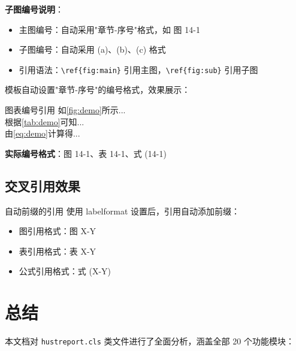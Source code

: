 \documentclass[linux]{hustreport}
\begin{document}
\textbf{子图编号说明}：
\begin{itemize}
    \item 主图编号：自动采用"章节-序号"格式，如 图 14-1
    \item 子图编号：自动采用 (a)、(b)、(c) 格式
    \item 引用语法：\verb|\ref{fig:main}| 引用主图，\verb|\ref{fig:sub}| 引用子图
\end{itemize}




模板自动设置"章节-序号"的编号格式，效果展示：

\begin{democode}{图表编号引用}
如\ref{fig:demo}所示... \\
根据\ref{tab:demo}可知... \\
由\ref{eq:demo}计算得...
\end{democode}

\textbf{实际编号格式}：图 14-1、表 14-1、式 (14-1)

\subsection{交叉引用效果}

\begin{demovert}{自动前缀的引用}
使用 labelformat 设置后，引用自动添加前缀：
\begin{itemize}
    \item 图引用格式：图 X-Y
    \item 表引用格式：表 X-Y
    \item 公式引用格式：式 (X-Y)
\end{itemize}
\end{demovert}

\newpage
\section*{总结}

本文档对 \texttt{hustreport.cls} 类文件进行了全面分析，涵盖全部 20 个功能模块：
\end{document}
